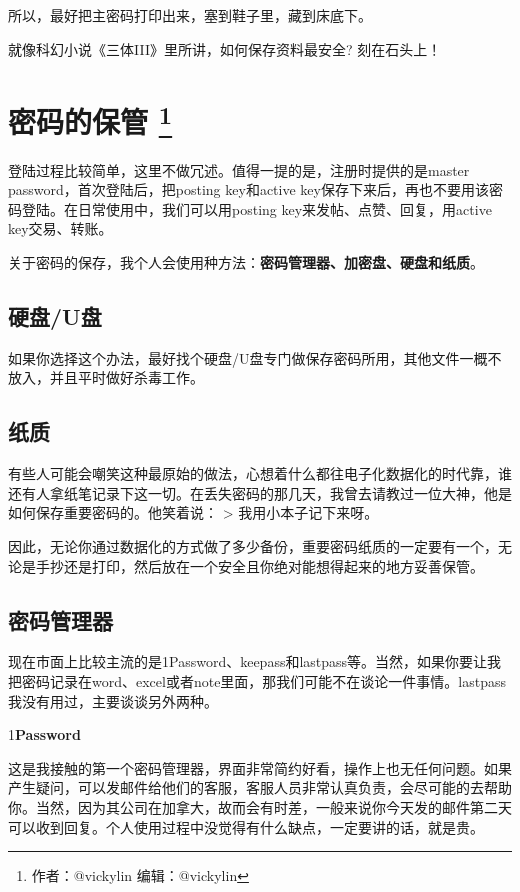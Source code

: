 \documentclass[]{ctexbook}
\begin{document}
所以，最好把主密码打印出来，塞到鞋子里，藏到床底下。

就像科幻小说《三体III》里所讲，如何保存资料最安全? 刻在石头上！

\section[密码的保管 ]{\texorpdfstring{密码的保管 \footnote{作者：@vickylin 编辑：@vickylin}}{密码的保管 }}

登陆过程比较简单，这里不做冗述。值得一提的是，注册时提供的是master password，首次登陆后，把posting key和active key保存下来后，再也不要用该密码登陆。在日常使用中，我们可以用posting key来发帖、点赞、回复，用active key交易、转账。

关于密码的保存，我个人会使用种方法：\textbf{密码管理器、加密盘、硬盘和纸质}。

\hypertarget{u}{%
\subsection{硬盘/U盘}\label{u}}

如果你选择这个办法，最好找个硬盘/U盘专门做保存密码所用，其他文件一概不放入，并且平时做好杀毒工作。

\subsection{纸质}

有些人可能会嘲笑这种最原始的做法，心想着什么都往电子化数据化的时代靠，谁还有人拿纸笔记录下这一切。在丢失密码的那几天，我曾去请教过一位大神，他是如何保存重要密码的。他笑着说：
\textgreater{} 我用小本子记下来呀。

因此，无论你通过数据化的方式做了多少备份，重要密码纸质的一定要有一个，无论是手抄还是打印，然后放在一个安全且你绝对能想得起来的地方妥善保管。

\subsection{密码管理器}

现在市面上比较主流的是1Password、keepass和lastpass等。当然，如果你要让我把密码记录在word、excel或者note里面，那我们可能不在谈论一件事情。lastpass我没有用过，主要谈谈另外两种。

1\textbf{Password}

这是我接触的第一个密码管理器，界面非常简约好看，操作上也无任何问题。如果产生疑问，可以发邮件给他们的客服，客服人员非常认真负责，会尽可能的去帮助你。当然，因为其公司在加拿大，故而会有时差，一般来说你今天发的邮件第二天可以收到回复。个人使用过程中没觉得有什么缺点，一定要讲的话，就是贵。
\end{document}
